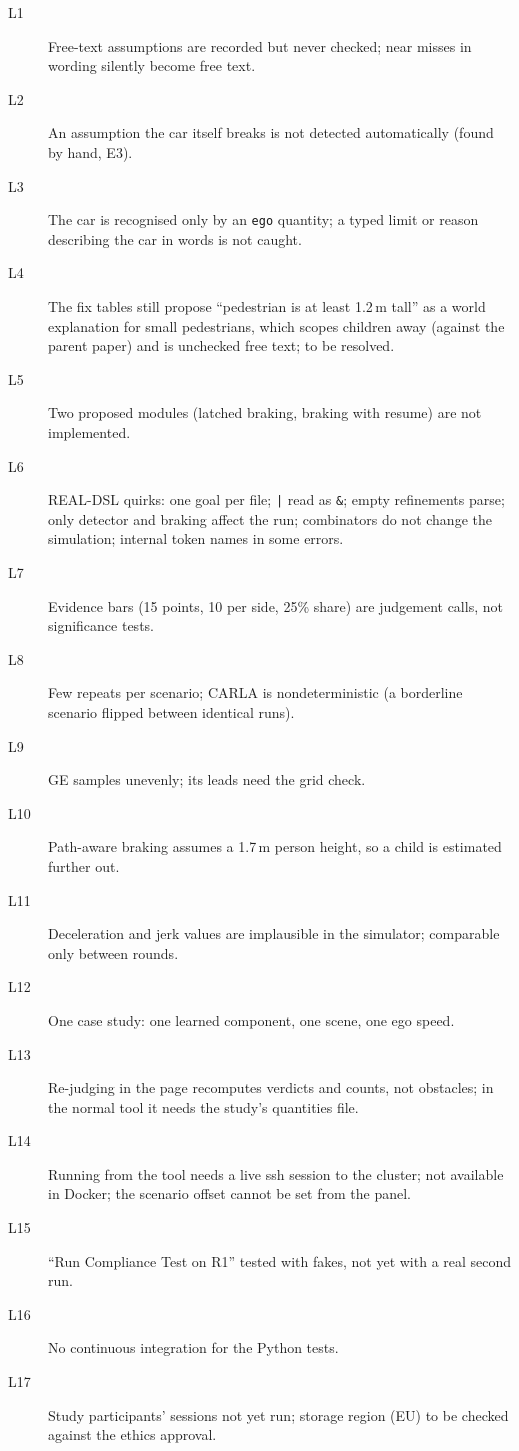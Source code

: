 \begin{description}
\item[L1] Free-text assumptions are recorded but never checked; near misses in wording silently become free text.
\item[L2] An assumption the car itself breaks is not detected automatically (found by hand, E3).
\item[L3] The car is recognised only by an \texttt{ego} quantity; a typed limit or reason describing the car in words is not caught.
\item[L4] The fix tables still propose ``pedestrian is at least 1.2\,m tall'' as a world explanation for small pedestrians, which scopes children away (against the parent paper) and is unchecked free text; to be resolved.
\item[L5] Two proposed modules (latched braking, braking with resume) are not implemented.
\item[L6] REAL-DSL quirks: one goal per file; \texttt{|} read as \texttt{\&}; empty refinements parse; only detector and braking affect the run; combinators do not change the simulation; internal token names in some errors.
\item[L7] Evidence bars (15 points, 10 per side, 25\% share) are judgement calls, not significance tests.
\item[L8] Few repeats per scenario; CARLA is nondeterministic (a borderline scenario flipped between identical runs).
\item[L9] GE samples unevenly; its leads need the grid check.
\item[L10] Path-aware braking assumes a 1.7\,m person height, so a child is estimated further out.
\item[L11] Deceleration and jerk values are implausible in the simulator; comparable only between rounds.
\item[L12] One case study: one learned component, one scene, one ego speed.
\item[L13] Re-judging in the page recomputes verdicts and counts, not obstacles; in the normal tool it needs the study's quantities file.
\item[L14] Running from the tool needs a live ssh session to the cluster; not available in Docker; the scenario offset cannot be set from the panel.
\item[L15] ``Run Compliance Test on R1'' tested with fakes, not yet with a real second run.
\item[L16] No continuous integration for the Python tests.
\item[L17] Study participants' sessions not yet run; storage region (EU) to be checked against the ethics approval.
\end{description}
